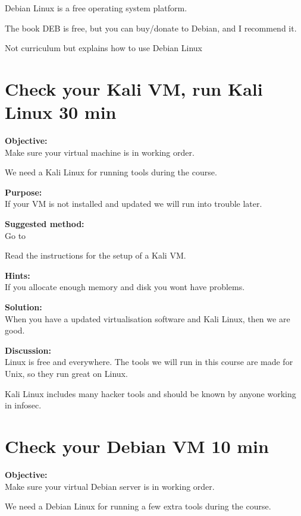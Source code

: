 \documentclass[a4paper,11pt,notitlepage]{report}
\begin{document}
Debian Linux is a free operating system platform.

The book DEB is free, but you can buy/donate to Debian, and I recommend it.

Not curriculum but explains how to use Debian Linux


\chapter{Check your Kali VM, run Kali Linux 30 min}
\label{ex:sw-basicVM}


{\bf Objective:}\\
Make sure your virtual machine is in working order.

We need a Kali Linux for running tools during the course.

{\bf Purpose:}\\
If your VM is not installed and updated we will run into trouble later.

{\bf Suggested method:}\\
Go to 

Read the instructions for the setup of a Kali VM.

{\bf Hints:}\\
If you allocate enough memory and disk you wont have problems.

{\bf Solution:}\\
When you have a updated virtualisation software and Kali Linux, then we are good.

{\bf Discussion:}\\
Linux is free and everywhere. The tools we will run in this course are made for Unix, so they run great on Linux.

Kali Linux includes many hacker tools and should be known by anyone working in infosec.

\chapter{Check your Debian VM 10 min}
\label{ex:sw-basicDebianVM}


{\bf Objective:}\\
Make sure your virtual Debian server is in working order.

We need a Debian Linux for running a few extra tools during the course.
\end{document}
